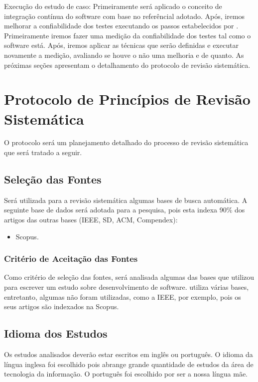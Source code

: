 Execução do estudo de caso: Primeiramente será aplicado o conceito de integração
contínua do software com base no referêncial adotado. Após, iremos melhorar a
confiabilidade dos testes executando os passos estabelecidos por \cite{e07}.
Primeiramente iremos fazer uma medição da confiabilidade dos testes tal como o
software está. Após, iremos aplicar as técnicas que serão definidas e executar
novamente a medição, avaliando se houve o não uma melhoria e de quanto.
As próximas seções apresentam o detalhamento do protocolo de revisão
sistemática.

\section{Protocolo de Princípios de Revisão Sistemática}
O protocolo será um planejamento detalhado do processo de revisão
sistemática que será tratado a seguir.
\subsection{Seleção das Fontes}
\label{sub:Seleção das Fontes}
Será utilizada para a revisão sistemática algumas bases de busca
automática. A seguinte base de dados será adotada para a pesquisa, pois
esta indexa 90\% dos artigos das outras bases (IEEE, SD, ACM, Compendex):

\begin{itemize}
    \item Scopus.
\end{itemize}

\subsubsection{Critério de Aceitação das Fontes}
\label{sub:Critério de Aceitação das Fontes}
Como critério de seleção das fontes, será analisada algumas das bases
que \cite{dyba} utilizou para escrever um estudo sobre desenvolvimento de
software. \cite{dyba} utiliza várias bases, entretanto, algumas não foram utilizadas,
como a IEEE, por exemplo, pois os seus artigos são indexados na Scopus.

\subsection{Idioma dos Estudos}
\label{sub:Idioma dos Estudos}
Os estudos analisados deverão estar escritos em inglês ou português. O idioma da
língua inglesa foi escolhido pois abrange grande quantidade de estudos da área
de tecnologia da informação. O português foi escolhido por ser a nossa língua mãe.

